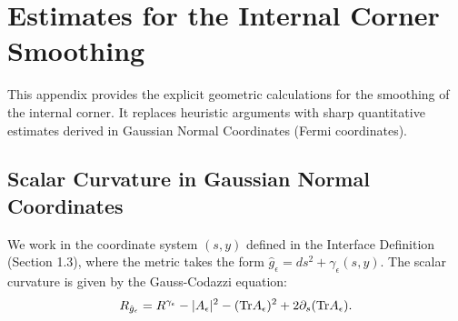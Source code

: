 \section{Estimates for the Internal Corner Smoothing}
\label{app:InternalSmoothing}

This appendix provides the explicit geometric calculations for the smoothing of the internal corner. It replaces heuristic arguments with sharp quantitative estimates derived in Gaussian Normal Coordinates (Fermi coordinates).

\subsection{Scalar Curvature in Gaussian Normal Coordinates}
We work in the coordinate system $(s, y)$ defined in the Interface Definition (Section 1.3), where the metric takes the form $\hat{g}_\epsilon = ds^2 + \gamma_\epsilon(s,y)$.
The scalar curvature is given by the Gauss-Codazzi equation:
\begin{equation}
    R_{\hat{g}_\epsilon} = R^{\gamma_\epsilon} - |A_\epsilon|^2 - (\mathrm{Tr} A_\epsilon)^2 + 2 \partial_s (\mathrm{Tr} A_\epsilon).
\end{equation}

